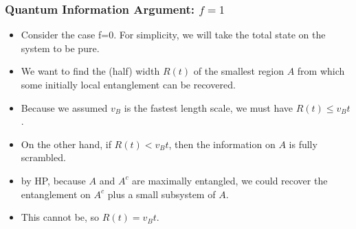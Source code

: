 \documentclass[10pt,aspectratio=169]{beamer}
\begin{document}
\begin{frame}
\frametitle{Quantum Information Argument: $f=1$}


\begin{itemize}

\item Consider the case f=0. For simplicity, we will take the total state on the system to be pure.

\item We want to find the (half) width $R(t)$ of the smallest region $A$ from which some initially local entanglement can be recovered.

\item Because we assumed $v_B$ is the fastest length scale, we must have $R(t) \leq v_B t$.

\item On the other hand, if $R(t)<v_B t$, then the information on $A$ is fully scrambled.

\item by HP, because $A$ and $A^{c}$ are maximally entangled, we could recover the entanglement on $A^{c}$ plus a small subsystem of $A$.

\item This cannot be, so $R(t) = v_B t$.

\end{itemize}

%

    
    


\end{frame}
\end{document}
